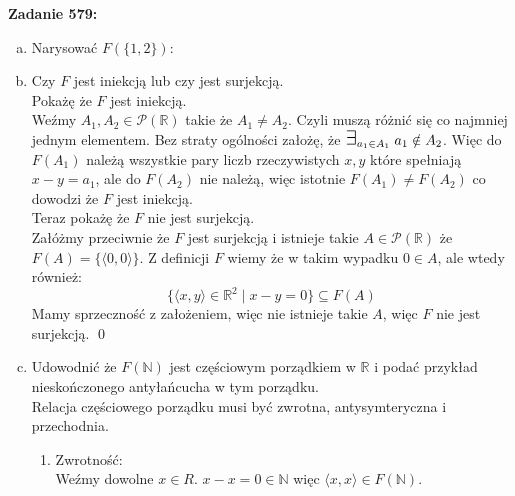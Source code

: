 \documentclass[10pt]{article}
\newcommand{\R}{\mathbb{R}}
\newcommand{\N}{\mathbb{N}}
\newcommand{\Pows}{\mathcal{P}}
\newcommand{\Exists}{{\Large\mbox{$\exists$}}}
\begin{document}
\textbf{Zadanie 579:}
\begin{enumerate}[a)]
    \item Narysować $F(\{1,2\})$:
    \begin{figure}[H]
        \centering
    \end{figure}

    \newpage
    
    \item Czy $F$ jest iniekcją lub czy jest surjekcją. \\[10pt]
    Pokażę że $F$ jest iniekcją. \\[5pt] 
    Weźmy $A_1, A_2 \in \Pows (\R)$ takie że $A_1 \neq A_2$. Czyli muszą różnić się co najmniej jednym elementem. Bez straty ogólności założę, że $\Exists_{a_1 \in A_1} \; a_1 \notin A_2$. Więc do $F(A_1)$ należą wszystkie pary liczb rzeczywistych $x, y$ które spełniają $x - y = a_1$, ale do $F(A_2)$ nie należą, więc istotnie $F(A_1) \neq F(A_2)$ co dowodzi że $F$ jest iniekcją. \\[10pt]
    Teraz pokażę że $F$ nie jest surjekcją. \\[5pt]
    Załóżmy przeciwnie że $F$ jest surjekcją i istnieje takie $A \in \Pows (\R)$ że $F(A) = \{\langle 0, 0 \rangle \}$. Z definicji $F$ wiemy że w takim wypadku $0 \in A$, ale wtedy również: 
    $$\{\langle x, y \rangle \in \R^2 \mid x - y = 0\} \subseteq F(A)$$
    Mamy sprzeczność z założeniem, więc nie istnieje takie $A$, więc $F$ nie jest surjekcją. \qed

    \item Udowodnić że $F(\N)$ jest częściowym porządkiem w $\R$ i podać przykład nieskończonego antyłańcucha w tym porządku. \\[10pt]
    Relacja częściowego porządku musi być zwrotna, antysymteryczna i przechodnia.
    \begin{enumerate}[1)]
        \item Zwrotność: \\[5pt]
        Weźmy dowolne $x \in R$. $x - x = 0 \in \N$ więc $\langle x, x \rangle \in F(\N)$.


\end{enumerate}
\end{enumerate}
\end{document}
